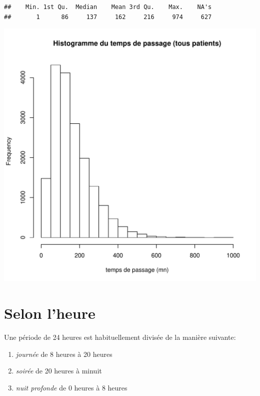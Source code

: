 \documentclass[12pt,english,french,twoside]{report}\usepackage[]{graphicx}\usepackage[]{color}
\makeatletter
\def\maxwidth{ %
  \ifdim\Gin@nat@width>\linewidth
    \linewidth
  \else
    \Gin@nat@width
  \fi
}
\newenvironment{kframe}{%
 \def\at@end@of@kframe{}%
 \ifinner\ifhmode%
  \def\at@end@of@kframe{\end{minipage}}%
  \begin{minipage}{\columnwidth}%
 \fi\fi%
 \def\FrameCommand##1{\hskip\@totalleftmargin \hskip-\fboxsep
 \colorbox{shadecolor}{##1}\hskip-\fboxsep
     \hskip-\linewidth \hskip-\@totalleftmargin \hskip\columnwidth}%
 \MakeFramed {\advance\hsize-\width
   \@totalleftmargin\z@ \linewidth\hsize
   \@setminipage}}%
 {\par\unskip\endMakeFramed%
 \at@end@of@kframe}
\newenvironment{knitrout}{}{} %
\makeatother
\begin{document}
\begin{knitrout}
\color{fgcolor}\begin{kframe}


{\ttfamily\noindent\color{warningcolor}{\#\# Warning: All formats failed to parse. No formats found.}}\begin{verbatim}
##    Min. 1st Qu.  Median    Mean 3rd Qu.    Max.    NA's 
##       1      86     137     162     216     974     627
\end{verbatim}
\end{kframe}
\includegraphics[width=\maxwidth]{figure/passage} 

\end{knitrout}




\section*{Selon l'heure}

Une période de 24 heures est habituellement divisée de la manière suivante:
\begin{enumerate}
  \item \emph{journée} de 8 heures à 20 heures
  \item \emph{soirée} de 20 heures à minuit
  \item  \emph{nuit profonde} de 0 heures à 8 heures
\end{enumerate}
\end{document}
